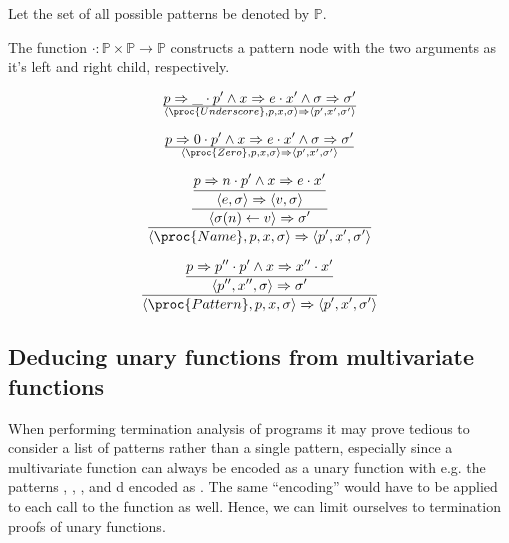 \begin{definition}

Let the set of all possible patterns be denoted by $\mathbb{P}$.

\end{definition}

\begin{definition}

The function $\cdot
:\mathbb{P}\times\mathbb{P}\rightarrow\mathbb{P}$ constructs a pattern node with the
two arguments as it's left and right child, respectively. 

\end{definition}

\begin{equation}
{
    p\Rightarrow \_\cdot p'
  \wedge
    x\Rightarrow e\cdot x'
  \wedge
    \sigma\Rightarrow\sigma'
}\over{
  \left\langle\proc{Underscore}, p,x,\sigma\right\rangle
  \Rightarrow
  \left\langle p',x',\sigma'\right\rangle
}
\end{equation}

\begin{equation}
{
    p\Rightarrow 0\cdot p'
  \wedge
    x\Rightarrow e\cdot x'
  \wedge
    \sigma\Rightarrow\sigma'
}\over{
  \left\langle\proc{Zero}, p,x,\sigma\right\rangle
  \Rightarrow
  \left\langle p',x',\sigma'\right\rangle
}
\end{equation}


\begin{equation}
{\displaystyle
{\displaystyle
{\displaystyle
    p\Rightarrow n\cdot p'
  \wedge
    x\Rightarrow e\cdot x'
\over\displaystyle
    \left\langle e,\sigma\right\rangle
    \Rightarrow
    \left\langle v,\sigma\right\rangle
}\over\displaystyle
    \left\langle\sigma(n)\leftarrow v\right\rangle
    \Rightarrow
    \sigma'
}\over\displaystyle
  \left\langle\proc{Name}, p,x,\sigma\right\rangle
  \Rightarrow
  \left\langle p',x',\sigma'\right\rangle
}
\end{equation}

\begin{equation}
{\displaystyle
{\displaystyle
    p\Rightarrow p''\cdot p'  
  \wedge
    x\Rightarrow x''\cdot x'
\over\displaystyle
  \left\langle p'', x'', \sigma\right\rangle
  \Rightarrow
  \sigma'
}
\over\displaystyle
  \left\langle\proc{Pattern}, p,x,\sigma\right\rangle
  \Rightarrow
  \left\langle p',x',\sigma'\right\rangle
}
\end{equation}

\subsection{Deducing unary functions from multivariate functions}

When performing termination analysis of programs it may prove tedious to
consider a list of patterns rather than a single pattern, especially since a
multivariate function can always be encoded as a unary function with e.g. the
patterns , , , and d encoded as . The
same ``encoding'' would have to be applied to each call to the function as
well. Hence, we can limit ourselves to termination proofs of unary functions.
